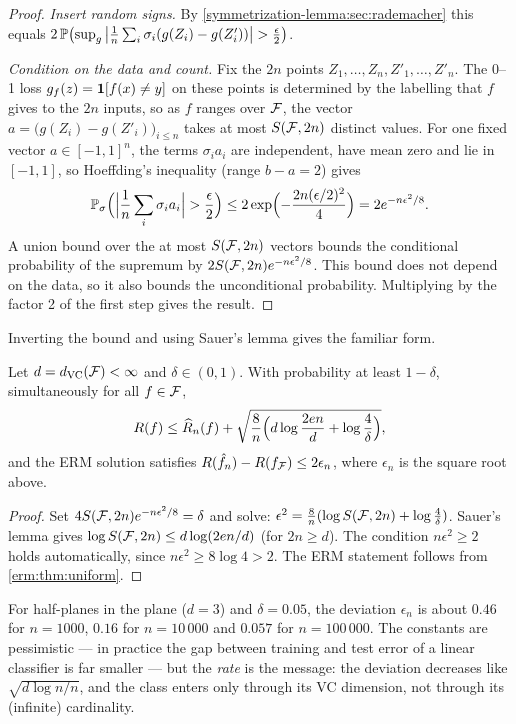 \begin{notechapter}
\begin{proof}
\emph{Insert random signs.} By \cref{symmetrization-lemma:sec:rademacher}
this equals
$2\,\mathbb{P}\bigl(\sup_g\left|\frac1n\sum_i\sigma_i(g(Z_i) - g(Z'_i))\right| > \frac\epsilon2\bigr)$.

\emph{Condition on the data and count.} Fix the $2n$ points
$Z_1,\dots,Z_n,Z'_1,\dots,Z'_n$. The 0--1 loss $g_f(z) = \mathbf{1}[f(x)\neq y]$ on
these points is determined by the labelling that $f$ gives to the $2n$ inputs,
so as $f$ ranges over $\mathcal{F}$, the vector
$a = \bigl(g(Z_i) - g(Z'_i)\bigr)_{i\leq n}$ takes at most $S(\mathcal{F},2n)$ distinct
values. For one fixed vector $a\in[-1,1]^n$, the terms $\sigma_ia_i$ are
independent, have mean zero and lie in $[-1,1]$, so Hoeffding's inequality
(range $b - a = 2$) gives
\[
  \mathbb{P}_\sigma\Bigl(\Bigl|\frac1n\sum_i\sigma_ia_i\Bigr| > \frac\epsilon2\Bigr)
  \leq 2\exp\Bigl(-\frac{2n(\epsilon/2)^2}{4}\Bigr) = 2e^{-n\epsilon^2/8}.
\]
A union bound over the at most $S(\mathcal{F},2n)$ vectors bounds the conditional
probability of the supremum by $2S(\mathcal{F},2n)e^{-n\epsilon^2/8}$. This bound does
not depend on the data, so it also bounds the unconditional probability.
Multiplying by the factor 2 of the first step gives the result.
\end{proof}

Inverting the bound and using Sauer's lemma gives the familiar form.

\begin{corollary}\label{symmetrization-lemma:cor:bound}
Let $d = d_{\mathrm{VC}}(\mathcal{F})<\infty$ and $\delta\in(0,1)$. With probability at
least $1-\delta$, simultaneously for all $f\in\mathcal{F}$,
\[
  R(f) \leq \widehat{R}_n(f) + \sqrt{\frac8n\Bigl(d\log\frac{2en}{d} + \log\frac4\delta\Bigr)},
\]
and the ERM solution satisfies $R(\hat f_n) - R(f_{\mathcal{F}}) \leq 2\epsilon_n$, where
$\epsilon_n$ is the square root above.
\end{corollary}

\begin{proof}
Set $4S(\mathcal{F},2n)e^{-n\epsilon^2/8} = \delta$ and solve:
$\epsilon^2 = \frac8n(\log S(\mathcal{F},2n) + \log\frac4\delta)$. Sauer's lemma gives
$\log S(\mathcal{F},2n) \leq d\log(2en/d)$ (for $2n \geq d$). The condition
$n\epsilon^2\geq 2$ holds automatically, since $n\epsilon^2\geq 8\log 4 > 2$.
The ERM statement follows from \cref{erm:thm:uniform}.
\end{proof}

\begin{example}
For half-planes in the plane ($d = 3$) and $\delta = 0.05$, the deviation
$\epsilon_n$ is about $0.46$ for $n = 1000$, $0.16$ for $n = 10\,000$ and
$0.057$ for $n = 100\,000$. The constants are pessimistic --- in practice the
gap between training and test error of a linear classifier is far smaller ---
but the \emph{rate} is the message: the deviation decreases like
$\sqrt{d\log n/n}$, and the class enters only through its VC dimension, not
through its (infinite) cardinality.
\end{example}


\end{notechapter}
